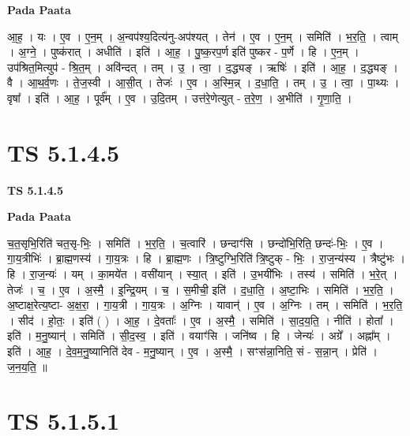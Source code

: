 \documentclass[17pt]{extarticle}
\begin{document}
\textbf{Pada Paata} \newline

आ॒ह॒ । यः । ए॒व । ए॒न॒म् । अ॒न्वप॑श्य॒दित्य॑नु-अप॑श्यत् । तेन॑ । ए॒व । ए॒न॒म् । समिति॑ । भ॒र॒ति॒ । त्वाम् । अ॒ग्ने॒ । पुष्क॑रात् । अधीति॑ । इति॑ । आ॒ह॒ । पु॒ष्क॒रप॒र्ण इति॑ पुष्कर - प॒र्णे । हि । ए॒न॒म् । उप॑श्रित॒मित्युप॑ - श्रि॒त॒म् । अवि॑न्दत् । तम् । उ॒ । त्वा॒ । द॒द्ध्यङ् । ऋषिः॑ । इति॑ । आ॒ह॒ । द॒द्ध्यङ् । वै । आ॒थ॒र्व॒णः । ते॒ज॒स्वी । आ॒सी॒त् । तेजः॑ । ए॒व । अ॒स्मि॒न्न् । द॒धा॒ति॒ । तम् । उ॒ । त्वा॒ । पा॒थ्यः । वृषा᳚ । इति॑ । आ॒ह॒ । पूर्व᳚म् । ए॒व । उ॒दि॒तम् । उत्त॑रे॒णेत्युत् - त॒रे॒ण॒ । अ॒भीति॑ । गृ॒णा॒ति॒ ।  \newline





\section{ TS 5.1.4.5 }

\textbf{TS 5.1.4.5 } \newline

\textbf{Pada Paata} \newline

च॒त॒सृभि॒रिति॑ चत॒सृ-भिः॒ । समिति॑ । भ॒र॒ति॒ । च॒त्वारि॑ । छन्दाꣳ॑सि । छन्दो॑भि॒रिति॒ छन्दः॑-भिः॒ । ए॒व । गा॒य॒त्रीभिः॑ । ब्रा॒ह्म॒णस्य॑ । गा॒य॒त्रः । हि । ब्रा॒ह्म॒णः । त्रि॒ष्टुग्भि॒रिति॑ त्रि॒ष्टुक् - भिः॒ । रा॒ज॒न्य॑स्य । त्रैष्टु॑भः । हि । रा॒ज॒न्यः॑ । यम् । का॒मये॑त । वसी॑यान् । स्या॒त् । इति॑ । उ॒भयी॑भिः । तस्य॑ । समिति॑ । भ॒रे॒त् । तेजः॑ । च॒ । ए॒व । अ॒स्मै॒ । इ॒न्द्रि॒यम् । च॒ । स॒मीची॒ इति॑ । द॒धा॒ति॒ । अ॒ष्टा॒भिः । समिति॑ । भ॒र॒ति॒ । अ॒ष्टाक्ष॒रेत्य॒ष्टा- अ॒क्ष॒रा॒ । गा॒य॒त्री । गा॒य॒त्रः । अ॒ग्निः । यावान्॑ । ए॒व । अ॒ग्निः । तम् । समिति॑ । भ॒र॒ति॒ । सीद॑ । हो॒तः॒ । इति॑ ( ) । आ॒ह॒ । दे॒वताः᳚ । ए॒व । अ॒स्मै॒ । समिति॑ । सा॒द॒य॒ति॒ । नीति॑ । होता᳚ । इति॑ । म॒नु॒ष्यान्॑ । समिति॑ । सी॒द॒स्व॒ । इति॑ । वयाꣳ॑सि । जनि॑ष्व । हि । जेन्यः॑ । अग्रे᳚ । अह्ना᳚म् । इति॑ । आ॒ह॒ । दे॒व॒म॒नु॒ष्यानिति॑ देव - म॒नु॒ष्यान् । ए॒व । अ॒स्मै॒ । सꣳस॑न्ना॒निति॒ सं - स॒न्ना॒न् । प्रेति॑ । ज॒न॒य॒ति॒ ॥  \newline





\section{ TS 5.1.5.1 }
\end{document}
